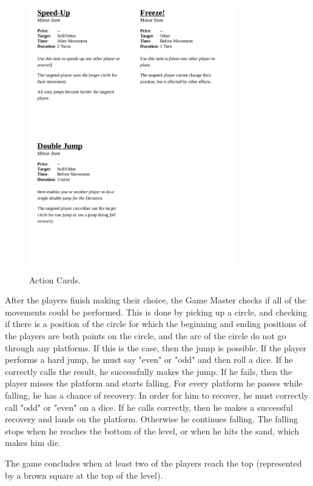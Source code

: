 \begin{figure}
    \centering
    \includegraphics[width=0.8\textwidth]{figures/Prototype/topmeifyoucan_2.png}
    \caption{Action Cards.}
    \label{fig:prot_2}
\end{figure}


After the players finish making their choice, the Game Master checks if all of the movements could be performed. This is done by picking up a circle, and checking if there is a position of the circle for which the beginning and ending positions of the players are  both points on the circle, and the arc of the circle do not go through any platforms. If this is the case, then the jump is possible. If the player performs a hard jump, he must say "even" or "odd" and then roll a dice. If he correctly calls the result, he successfully makes the jump. If he fails, then the player misses the platform and starts falling. For every platform he passes while falling, he has a chance of recovery. In order for him to recover, he must correctly call "odd" or "even" on a dice. If he calls correctly, then he makes a successful recovery and lands on the platform. Otherwise he continues falling. The falling stops when he reaches the bottom of the level, or when he hits the sand, which makes him die.

The game concludes when at least two of the players reach the top (represented by a brown square  at the top of the level).



